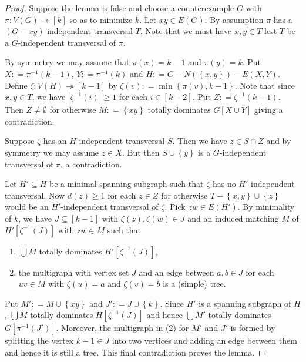 \documentclass[openany]{tufte-book} %
\theoremstyle{plain}
\newcommand{\set}[1]{\left\{ #1 \right\}}
\newcommand{\card}[1]{\left|#1\right|}
\newcommand{\funcsurj}[3]{#1\colon #2 \twoheadrightarrow #3}
\newcommand{\irange}[1]{\left[#1\right]}
\newcommand{\brackets}[1]{\left[ #1 \right]}
\newcommand{\DefinedAs}{\mathrel{\mathop:}=}
\begin{document}
\begin{proof}
Suppose the lemma is false and choose a counterexample $G$ with
$\funcsurj{\pi}{V(G)}{\irange{k}}$ so as to minimize $k$.  Let $xy \in E(G)$.
By assumption $\pi$ has a $(G-xy)$-independent transversal $T$.  Note that we
must have $x,y \in T$ lest $T$ be a $G$-independent transversal of $\pi$.

By symmetry we may assume that $\pi(x) = k-1$ and $\pi(y) = k$. Put $X
\DefinedAs \pi^{-1}(k-1)$, $Y \DefinedAs \pi^{-1}(k)$ and $H \DefinedAs G -
N(\set{x, y}) - E(X,Y)$. Define $\funcsurj{\zeta}{V(H)}{\irange{k-1}}$ by $\zeta(v)
\DefinedAs \min\set{\pi(v), k-1}$. Note that since $x,y \in T$, we have
$\card{\zeta^{-1}(i)} \geq 1$ for each $i \in \irange{k-2}$.  Put $Z \DefinedAs
\zeta^{-1}(k-1)$. Then $Z \neq \emptyset$ for otherwise $M \DefinedAs \set{xy}$
totally dominates $G[X \cup Y]$ giving a contradiction.

Suppose $\zeta$ has an $H$-independent transversal $S$.  Then we have $z \in S
\cap Z$ and by symmetry we may assume $z \in X$.  But then $S \cup \set{y}$ is
a $G$-independent transversal of $\pi$, a contradiction.

Let $H' \subseteq H$ be a minimal spanning subgraph such that $\zeta$ has no
$H'$-independent transversal.  Now $d(z) \geq 1$ for each $z \in Z$ for
otherwise $T - \set{x,y} \cup \set{z}$ would be an $H'$-independent transversal
of $\zeta$.  Pick $zw \in E(H')$.  By minimality of $k$, we have $J \subseteq
\irange{k-1}$ with $\zeta(z), \zeta(w) \in J$ and an induced matching $M$ of
$H'\brackets{\zeta^{-1}(J)}$ with $zw \in M$ such that
\begin{enumerate}
  \item $\bigcup M$ totally dominates $H'\brackets{\zeta^{-1}(J)}$,
  \item the multigraph with vertex set $J$ and an edge between $a, b \in J$ for
  each $uv \in M$ with $\zeta(u) = a$ and $\zeta(v) = b$ is a (simple) tree.
\end{enumerate}

Put $M' \DefinedAs M \cup \set{xy}$ and $J' \DefinedAs J \cup \set{k}$.
Since $H'$ is a spanning subgraph of $H$, $\bigcup M$ totally dominates
$H\brackets{\zeta^{-1}(J)}$ and hence $\bigcup M'$ totally dominates
$G\brackets{\pi^{-1}(J')}$.  Moreover, the multigraph in (2) for $M'$ and $J'$
is formed by splitting the vertex $k-1 \in J$ into two vertices and adding an edge
between them and hence it is still a tree.  This final contradiction proves the
lemma.
\end{proof}
\end{document}
